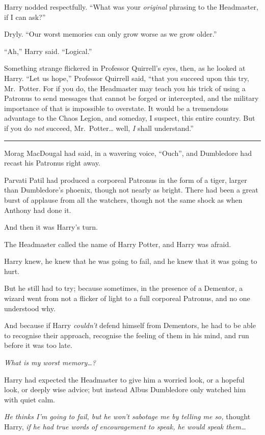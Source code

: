 Harry nodded respectfully. ``What was your \emph{original} phrasing to
the Headmaster, if I can ask?''

Dryly. ``Our worst memories can only grow worse as we grow older.''

``Ah,'' Harry said. ``Logical.''

Something strange flickered in Professor Quirrell's eyes, then, as he
looked at Harry. ``Let us hope,'' Professor Quirrell said, ``that you
succeed upon this try, Mr.~Potter. For if you do, the Headmaster may
teach you his trick of using a Patronus to send messages that cannot be
forged or intercepted, and the military importance of that is impossible
to overstate. It would be a tremendous advantage to the Chaos Legion,
and someday, I suspect, this entire country. But if you do \emph{not}
succeed, Mr.~Potter\ldots{} well, \emph{I} shall understand.''

\begin{center}\rule{3in}{0.4pt}\end{center}

Morag MacDougal had said, in a wavering voice, ``Ouch'', and Dumbledore
had recast his Patronus right away.

Parvati Patil had produced a corporeal Patronus in the form of a tiger,
larger than Dumbledore's phoenix, though not nearly as bright. There had
been a great burst of applause from all the watchers, though not the
same shock as when Anthony had done it.

And then it was Harry's turn.

The Headmaster called the name of Harry Potter, and Harry was afraid.

Harry knew, he knew that he was going to fail, and he knew that it was
going to hurt.

But he still had to try; because sometimes, in the presence of a
Dementor, a wizard went from not a flicker of light to a full corporeal
Patronus, and no one understood why.

And because if Harry \emph{couldn't} defend himself from Dementors, he
had to be able to recognise their approach, recognise the feeling of
them in his mind, and run before it was too late.

\emph{What is my worst memory\ldots{}?}

Harry had expected the Headmaster to give him a worried look, or a
hopeful look, or deeply wise advice; but instead Albus Dumbledore only
watched him with quiet calm.

\emph{He thinks I'm going to fail, but he won't sabotage me by telling
me so,} thought Harry, \emph{if he had true words of encouragement to
speak, he would speak them\ldots{}}


